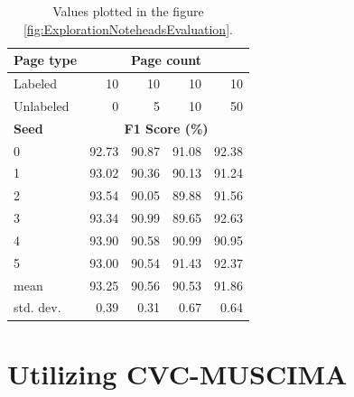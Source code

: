 \begin{table}[ht]
    \centering
    \begin{tabular}{l@{\hspace{2.0cm}}rrrr}
        \toprule
        \textbf{Page type} & \multicolumn{4}{c}{\textbf{Page count}} \\
        \midrule
        Labeled   & 10 & 10 & 10 & 10 \\
        Unlabeled & 0  & 5  & 10 & 50 \\
        \midrule
        \textbf{Seed} & \multicolumn{4}{c}{\textbf{F1 Score (\%)}} \\
        \midrule
        0 & 92.73 & 90.87 & 91.08 & 92.38 \\
        1 & 93.02 & 90.36 & 90.13 & 91.24 \\
        2 & 93.54 & 90.05 & 89.88 & 91.56 \\
        3 & 93.34 & 90.99 & 89.65 & 92.63 \\
        4 & 93.90 & 90.58 & 90.99 & 90.95 \\
        5 & 93.00 & 90.54 & 91.43 & 92.37 \\
        \midrule
        mean & 93.25 & 90.56 & 90.53 & 91.86 \\
        std. dev. & 0.39 & 0.31 & 0.67 & 0.64 \\
        \bottomrule
    \end{tabular}
    \caption{Values plotted in the figure \ref{fig:ExplorationNoteheadsEvaluation}.}
    \label{tab:ExplorationNoteheads}
\end{table}


\section{Utilizing CVC-MUSCIMA}
\label{sec:UtilizingCvcMuscima}

